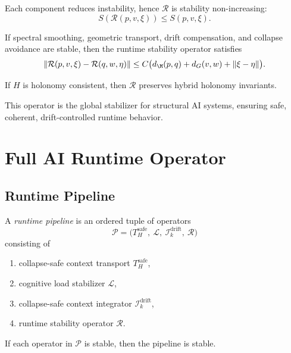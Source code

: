 \begin{lemma}
Each component reduces instability, hence $\mathcal{R}$ is stability
non-increasing:
\[
S(\mathcal{R}(p,v,\xi)) \le S(p,v,\xi).
\]
\end{lemma}

\begin{theorem}
If spectral smoothing, geometric transport, drift compensation, and
collapse avoidance are stable, then the runtime stability operator satisfies
\[
\| \mathcal{R}(p,v,\xi) - \mathcal{R}(q,w,\eta) \|
\le C \big( d_\M(p,q) + d_G(v,w) + \|\xi - \eta\| \big).
\]
\end{theorem}

\begin{lemma}
If $H$ is holonomy consistent, then $\mathcal{R}$ preserves hybrid holonomy
invariants.
\end{lemma}

\begin{remark}
This operator is the global stabilizer for structural AI systems, ensuring
safe, coherent, drift-controlled runtime behavior.
\end{remark}

\section{Full AI Runtime Operator}

\subsection{Runtime Pipeline}

\begin{definition}
A \emph{runtime pipeline} is an ordered tuple of operators
\[
\mathcal{P}
= \big( T_H^\mathrm{safe},\ \mathcal{L},\ \mathcal{I}_k^\mathrm{drift},\ \mathcal{R} \big)
\]
consisting of
\begin{enumerate}
    \item collapse-safe context transport $T_H^\mathrm{safe}$,
    \item cognitive load stabilizer $\mathcal{L}$,
    \item collapse-safe context integrator $\mathcal{I}_k^\mathrm{drift}$,
    \item runtime stability operator $\mathcal{R}$.
\end{enumerate}
\end{definition}

\begin{lemma}
If each operator in $\mathcal{P}$ is stable, then the pipeline is stable.
\end{lemma}

